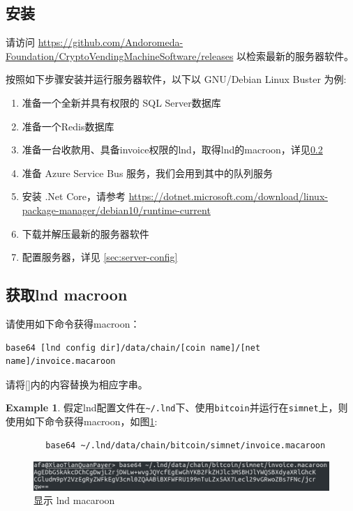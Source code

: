 \documentclass[a4paper,11pt]{article}
\theoremstyle{definition}
\newtheorem{exmp}{Example}[section]
\begin{document}
\subsection{安装}

请访问 \url{https://github.com/Andoromeda-Foundation/CryptoVendingMachineSoftware/releases} 以检索最新的服务器软件。

按照如下步骤安装并运行服务器软件，以下以 GNU/Debian Linux Buster 为例:

    \begin{enumerate}
        \item 准备一个全新并具有权限的 SQL Server数据库
        \item 准备一个Redis数据库
        \item 准备一台收款用、具备invoice权限的lnd，取得lnd的macroon，详见\ref{sec:lnd-macroon}
        \item 准备 Azure Service Bus 服务，我们会用到其中的队列服务
        \item 安装 .Net Core，请参考 \url{https://dotnet.microsoft.com/download/linux-package-manager/debian10/runtime-current}
        \item 下载并解压最新的服务器软件
        \item 配置服务器，详见 \ref{sec:server-config}
    \end{enumerate}

\subsection{获取lnd macroon}\label{sec:lnd-macroon}

请使用如下命令获得macroon：

\begin{verbatim}
base64 [lnd config dir]/data/chain/[coin name]/[net name]/invoice.macaroon
\end{verbatim}


请将[]内的内容替换为相应字串。

    \begin{exmp}
    假定lnd配置文件在\verb|~/.lnd|下、使用\verb|bitcoin|并运行在\verb|simnet|上，则使用如下命令获得macroon，如图\ref{fig:show-macaroon}:
        \begin{verbatim}
        base64 ~/.lnd/data/chain/bitcoin/simnet/invoice.macaroon
        \end{verbatim}       
    \end{exmp}

    \begin{figure}[htbp]
    \minipage[b][][b]{\textwidth}
        \includegraphics[width=\linewidth]{lnd-mac.png}
        \caption{显示 lnd macaroon}
        \label{fig:show-macaroon}
    \endminipage\hfill
    \end{figure}
        
\end{document}
